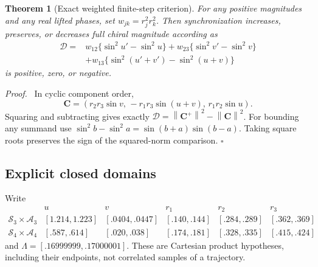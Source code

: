\documentclass[11pt,a4paper]{article}
\numberwithin{equation}{section}
\newtheorem{theorem}{Theorem}[section]
\newenvironment{proof}[1][Proof]{\par\noindent\textit{#1.}\ \ignorespaces}
{\unskip\nobreak\hfill$\square$\par}
\newcommand{\norm}[1]{\left\lVert#1\right\rVert}
\newcommand{\chiral}{\mathbf C}
\begin{document}
\begin{theorem}[Exact weighted finite-step criterion]\label{thm:weighted}
For any positive magnitudes and any real lifted phases, set
$w_{jk}=r_j^2r_k^2$. Then synchronization increases, preserves, or decreases
full chiral magnitude according as
\begin{equation}\label{eq:weighted}
\begin{aligned}
\mathcal D={}&w_{12}\{\sin^2u'-\sin^2u\}
+w_{23}\{\sin^2v'-\sin^2v\}\\
&+w_{13}\{\sin^2(u'+v')-\sin^2(u+v)\}
\end{aligned}
\end{equation}
is positive, zero, or negative.
\end{theorem}
\begin{proof}
In cyclic component order,
\[
\chiral=(r_2r_3\sin v,\,-r_1r_3\sin(u+v),\,r_1r_2\sin u).
\]
Squaring and subtracting gives exactly
$\mathcal D=\norm{\chiral^+}^2-\norm{\chiral}^2$.
For bounding any summand use
$\sin^2b-\sin^2a=\sin(b+a)\sin(b-a)$.
Taking square roots preserves the sign of the squared-norm comparison.
\end{proof}

\subsection{Explicit closed domains}\label{sec:domaintheorems}
Write
\begin{equation}\label{eq:domains}
\begin{array}{c|cc|ccc}
&u&v&r_1&r_2&r_3\\ \hline
\mathcal S_3\times\mathcal A_3&
[1.214,1.223]&[.0404,.0447]&[.140,.144]&[.284,.289]&[.362,.369]\\
\mathcal S_4\times\mathcal A_4&
[.587,.614]&[.020,.038]&[.174,.181]&[.328,.335]&[.415,.424]
\end{array}
\end{equation}
and $\Lambda=[.16999999,.17000001]$.
These are Cartesian product hypotheses, including their endpoints, not
correlated samples of a trajectory.
\end{document}
